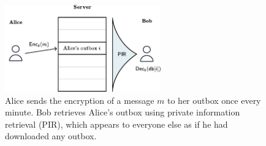 \begin{figure}
    \centering
    \includegraphics[width=0.6\textwidth]{pirfigure.pdf}
\caption{Alice sends the encryption of a message $m$ to her outbox once every minute. Bob retrieves Alice's outbox using private information retrieval (PIR), which appears to everyone else as if he had downloaded any outbox.}
\label{fig:highlevelpir}
\end{figure}

